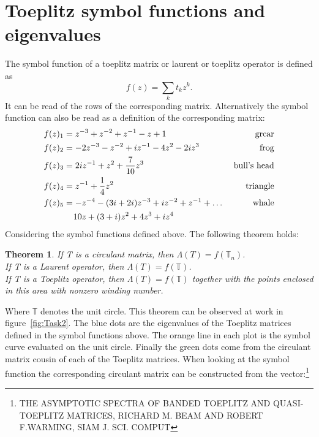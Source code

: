 \section{Toeplitz symbol functions and eigenvalues}
The symbol function of a toeplitz matrix or laurent or toeplitz operator is defined as
\begin{equation}
f(z) = \sum_k t_k z^k. 
\end{equation}
It can be read of the rows of the corresponding matrix. Alternatively the symbol function can also be read as a definition of the corresponding matrix:
\begin{align}
f(z)_1 &=   z^{-3} +  z^{-2} +   z^{-1} -   z + 1                      & \text{    grcar} \\
f(z)_2 &= -2z^{-3} -  z^{-2} +  iz^{-1}            - 4z^{2} - 2i z^{3} & \text{    frog} \\
f(z)_3 &=                      2iz^{-1} +    z^{2} + \frac{7}{10}z^{3} & \text{    bull's head} \\
f(z)_4 &=                        z^{-1}            + \frac{1}{4}z^{2}  & \text{    triangle} \\
f(z)_5 &= -z^{-4} - (3i + 2i)z^{-3} + iz^{-2} + z^{-1} +\dots          & \text{    whale}\\
     & \;\;\;\;  10z + (3 + i)z^{2} + 4z^{3} + iz^{4}                      \notag
\end{align}
Considering the symbol functions defined above. The following theorem holds: \\
\newtheorem{theorem}{Theorem}
\begin{theorem}
If T is a circulant matrix, then $\Lambda (T) = f(\mathbb{T}_n)$. \\
If T is a Laurent operator, then $\Lambda (T) = f(\mathbb{T})$.   \\
If T is a Toeplitz operator, then $\Lambda (T) = f(\mathbb{T})$ together with the points enclosed in this area with nonzero winding number.
\end{theorem}
Where $\mathbb{T}$ denotes the unit circle. This theorem can be observed at work in figure~\ref{fig:Task2}. The blue dots are the eigenvalues of the Toeplitz matrices defined in the symbol functions above. The orange line in each plot is the symbol curve evaluated on the unit circle. Finally the green dots come from the circulant matrix cousin of each of the Toeplitz matrices. When looking at the symbol function the corresponding circulant matrix can be constructed from the vector:\footnote{THE ASYMPTOTIC SPECTRA OF BANDED TOEPLITZ AND QUASI-TOEPLITZ MATRICES, RICHARD M. BEAM AND ROBERT F.WARMING, SIAM J. SCI. COMPUT}
